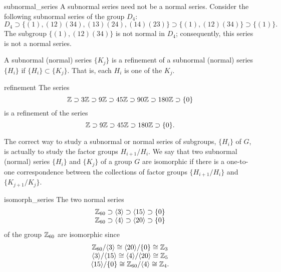  
 
\begin{example}{subnormal_series}
A subnormal series need not be a normal series.  Consider the
following subnormal series of the group $D_4$: 
\[
D_4 \supset \{ (1),
(12)(34), (13)(24), (14)(23) \} \supset  \{  (1), (12)(34) \} 
\supset \{ (1) \}.
\]
The subgroup $\{  (1), (12)(34) \}$ is not normal in $D_4$;
consequently, this series is not a normal series.
\end{example}
 
 
 
 
A subnormal (normal) series $\{ K_j \}$ is a {\bfi refinement of a
subnormal (normal) series\/} $\{ H_i \}$ if $\{ H_i \} \subset \{ K_j
\}$. That is, each $H_i$ is one of the $K_j$. 
 
 
 
\begin{example}{refinement}
The series
\[
{\Bbb Z} \supset 3{\Bbb Z} \supset 9{\Bbb Z} \supset 45{\Bbb Z}
\supset 90{\Bbb Z} \supset 180{\Bbb Z} \supset \{0\}
\]
is a refinement of the series
\[
{\Bbb Z} \supset 9{\Bbb Z} \supset 45{\Bbb Z} \supset 180{\Bbb Z} 
\supset \{0\}.
\]
\end{example}
 
 

 
 
The correct way to study a subnormal or normal series of subgroups,
$\{ H_i \}$ of $G$, is actually to study the factor groups
$H_{i+1}/H_i$.  We say that two subnormal (normal) series $\{H_i \}$
and $\{ K_j \}$ of a group $G$ are {\bfi isomorphic\/} if there is a
one-to-one correspondence between the collections of factor groups
$\{H_{i+1}/H_i \}$ and $\{ K_{j+1}/ K_j \}$. 
 
 
 
\begin{example}{isomorph_series}
The two normal series
\[
\begin{array}{c}
{\Bbb Z}_{60} \supset \langle 3 \rangle \supset  \langle 15 \rangle
\supset \{ 0 \} \\
{\Bbb Z}_{60} \supset \langle 4 \rangle \supset  \langle 20 \rangle
\supset \{ 0 \}
\end{array}
\]
of the group ${\Bbb Z}_{60}$ are isomorphic since
\[
\begin{array}{c}
{\Bbb Z}_{60} / \langle 3 \rangle \cong \langle 20 \rangle /
\{ 0 \} \cong {\Bbb Z}_{3}
\\
\langle 3 \rangle / \langle 15 \rangle
\cong \langle 4 \rangle /  \langle 20 \rangle \cong {\Bbb Z}_{5}
\\
\langle 15 \rangle / \{ 0 \} \cong {\Bbb Z}_{60} / \langle 4 \rangle
\cong {\Bbb Z}_4.
\end{array}
\]
\end{example}
 

